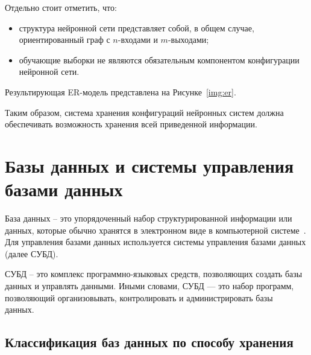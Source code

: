 Отдельно стоит отметить, что:
\begin{itemize}
    \item структура нейронной сети представляет собой, в общем случае, ориентированный граф с $n$-входами и $m$-выходами;
    \item обучающие выборки не являются обязательным компонентом конфигурации нейронной сети.
\end{itemize}

Результирующая ER-модель представлена на Рисунке~\ref{img:er}.


Таким образом, система хранения конфигураций нейронных систем должна обеспечивать возможность хранения всей приведенной информации.

\newpage

\section{Базы данных и системы управления базами данных}

База данных -- это упорядоченный набор структурированной информации или данных, которые обычно хранятся в электронном виде в компьютерной системе~\cite{database}. Для управления базами данных используется системы управления базами данных (далее СУБД). 

СУБД -- это комплекс программно-языковых средств, позволяющих создать базы данных и управлять данными. Иными словами, СУБД — это набор программ, позволяющий организовывать, контролировать и администрировать базы данных.~\cite{subd}

\subsection{Классификация баз данных по способу хранения}

